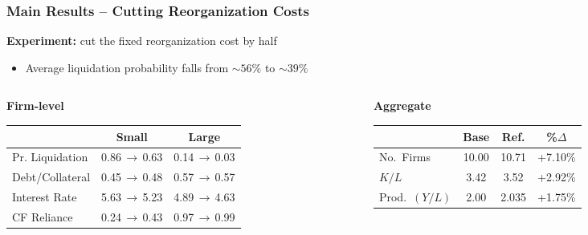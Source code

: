 \documentclass[aspectratio=169,xcolor=table]{beamer}
\begin{document}
\begin{frame}[label=effects] \frametitle{Main Results -- Cutting Reorganization Costs \hfill  \hyperlink{modelfit}{}  \hyperlink{Aggeffects}{}}

\textbf{Experiment:} cut the fixed reorganization cost by half
\begin{itemize} \small
    \item Average liquidation probability falls from $\sim 56\%$ to $\sim 39\%$
\end{itemize} \normalsize \vspace{1mm}

\begin{columns}[T,onlytextwidth]
\begin{column}{0.57\textwidth}
\centering \footnotesize
\textbf{Firm-level} \\[1mm]
\renewcommand{\arraystretch}{0.95}
\begin{tabular}{lcc}
\toprule
 & \textbf{Small} & \textbf{Large} \\
\midrule
Pr. Liquidation & 0.86\,$\to$\,\textcolor{primary}{0.63} & 0.14\,$\to$\,\textcolor{primary}{0.03} \\
Debt/Collateral & 0.45\,$\to$\,\textcolor{primary}{0.48} & 0.57\,$\to$\,\textcolor{primary}{0.57} \\
Interest Rate   & 5.63\,$\to$\,\textcolor{primary}{5.23} & 4.89\,$\to$\,\textcolor{primary}{4.63} \\
CF Reliance     & 0.24\,$\to$\,\textcolor{primary}{0.43} & 0.97\,$\to$\,\textcolor{primary}{0.99} \\
\bottomrule
\end{tabular}
\end{column}
\begin{column}{0.42\textwidth}
\centering \footnotesize
\textbf{Aggregate}\\[1mm]
\renewcommand{\arraystretch}{0.95}
\begin{tabular}{lccc}
\toprule
 & \textbf{Base} & \textbf{Ref.} & \textbf{\%$\Delta$} \\
\midrule
No.\ Firms & 10.00 & 10.71 & +7.10\% \\
$K/L$ & 3.42 & 3.52 & +2.92\% \\
Prod.\ $(Y/L)$ & 2.00 & 2.035 & \textcolor{primary}{+1.75\%} \\
\bottomrule
\end{tabular}
\end{column}
\end{columns}
\vspace{4mm}


\end{frame}
\end{document}
